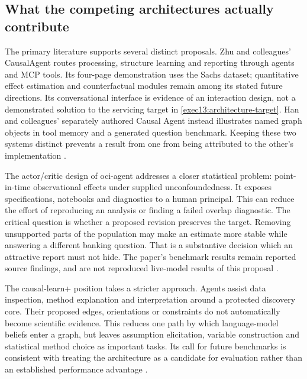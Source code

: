 \subsection{What the competing architectures actually contribute}

The primary literature supports several distinct proposals. Zhu and colleagues'
CausalAgent routes processing, structure learning and reporting through agents
and MCP tools. Its four-page demonstration uses the Sachs dataset; quantitative
effect estimation and counterfactual modules remain among its stated future
directions. Its conversational interface is evidence of an interaction design,
not a demonstrated solution to the servicing target in
\eqref{exec13:architecture-target}. Han and colleagues' separately authored
Causal Agent instead illustrates named graph objects in tool memory and a
generated question benchmark. Keeping these two systems distinct prevents a
result from one from being attributed to the other's implementation
\cite{v12_la_2602_11527,exec13_census_causal_agent}.

The actor/critic design of oci-agent addresses a closer statistical problem:
point-in-time observational effects under supplied unconfoundedness. It exposes
specifications, notebooks and diagnostics to a human principal. This can reduce
the effort of reproducing an analysis or finding a failed overlap diagnostic.
The critical question is whether a proposed revision preserves the target.
Removing unsupported parts of the population may make an estimate more stable
while answering a different banking question. That is a substantive decision
which an attractive report must not hide. The paper's benchmark results remain
reported source findings, and are not reproduced live-model results of this
proposal \cite{v12_la_2607_22443}.

The causal-learn+ position takes a stricter approach. Agents assist data
inspection, method explanation and interpretation around a protected discovery
core. Their proposed edges, orientations or constraints do not automatically
become scientific evidence. This reduces one path by which language-model
beliefs enter a graph, but leaves assumption elicitation, variable construction
and statistical method choice as important tasks. Its call for future
benchmarks is consistent with treating the architecture as a candidate for
evaluation rather than an established performance advantage
\cite{v12_la_2606_23608}.

